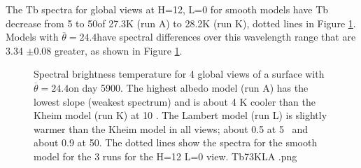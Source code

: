 \documentclass{article}
\begin{document}
 The Tb spectra for global views at H=12, L=0 for smooth models have Tb decrease
 from 5 to 50\um of 27.3K (run A) to 28.2K (run K), dotted lines in Figure
 \ref{Tb73KLA}.  Models with $\overline{\theta}=24.4$\qd have spectral
 differences over this wavelength range that are 3.34 $\pm$0.08 greater, as
 shown in Figure \ref{Tb73KLA}.

\begin{figure}[!ht] 
\caption[Global Tb]{Spectral brightness temperature for 4 global views of a
  surface with $\overline{\theta}=24.4$\qd on day 5900. The highest albedo model
  (run A) has the lowest slope (weakest spectrum) and is about 4 K cooler than
  the Kheim model (run K) at 10 \um. The Lambert model (run L) is slightly
  warmer than the Kheim model in all views; about 0.5 at 5\um~ and about 0.9 at
  50\um. The dotted lines show the spectra for the smooth model for the 3 runs
  for the H=12 L=0 view.
\label{Tb73KLA} Tb73KLA .png  }
\end{figure} 
\end{document}
